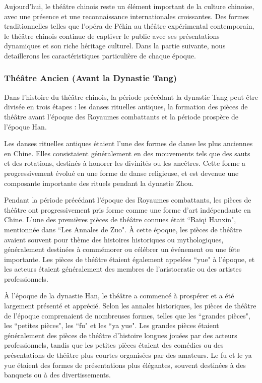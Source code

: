 \documentclass[UTF8,a4paper,12pt]{ctexart}
\numberwithin{equation}{section}
\newcommand{\mycite}[1]{\cite{#1}}
\begin{document}
Aujourd'hui, le théâtre chinois reste un élément important de la culture chinoise, avec une présence et une reconnaissance internationales croissantes. Des formes traditionnelles telles que l'opéra de Pékin au théâtre expérimental contemporain, le théâtre chinois continue de captiver le public avec ses présentations dynamiques et son riche héritage culturel. Dans la partie suivante, nous detaillerons les caractéristiques particulière de chaque époque.
\subsubsection{Théâtre Ancien (Avant la Dynastie Tang)}
Dans l'histoire du théâtre chinois, la période précédant la dynastie Tang peut être divisée en trois étapes : les danses rituelles antiques, la formation des pièces de théâtre avant l'époque des Royaumes combattants et la période prospère de l'époque Han\mycite{22}.

Les danses rituelles antiques étaient l'une des formes de danse les plus anciennes en Chine. Elles consistaient généralement en des mouvements tels que des sauts et des rotations, destinés à honorer les divinités ou les ancêtres. Cette forme a progressivement évolué en une forme de danse religieuse, et est devenue une composante importante des rituels pendant la dynastie Zhou.

Pendant la période précédant l'époque des Royaumes combattants, les pièces de théâtre ont progressivement pris forme comme une forme d'art indépendante en Chine. L'une des premières pièces de théâtre connues était ``Baiqi Hanxin", mentionnée dans ``Les Annales de Zuo". À cette époque, les pièces de théâtre avaient souvent pour thème des histoires historiques ou mythologiques, généralement destinées à commémorer ou célébrer un événement ou une fête importante. Les pièces de théâtre étaient également appelées ``yue" à l'époque, et les acteurs étaient généralement des membres de l'aristocratie ou des artistes professionnels.

À l'époque de la dynastie Han, le théâtre a commencé à prospérer et a été largement présenté et apprécié. Selon les annales historiques, les pièces de théâtre de l'époque comprenaient de nombreuses formes, telles que les ``grandes pièces", les ``petites pièces", les ``fu" et les ``ya yue"\mycite{13}. Les grandes pièces étaient généralement des pièces de théâtre d'histoire longues jouées par des acteurs professionnels, tandis que les petites pièces étaient des comédies ou des présentations de théâtre plus courtes organisées par des amateurs. Le fu et le ya yue étaient des formes de présentations plus élégantes, souvent destinées à des banquets ou à des divertissements.
\end{document}
